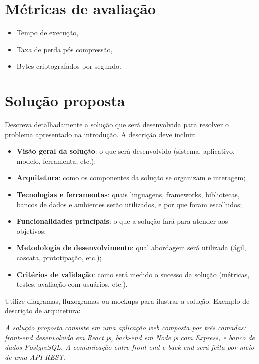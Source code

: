 \documentclass[
    12pt,                %
    openright,           %
    oneside,             %
    a4paper,             %
    english,             %
    brazil               %
]{abntex2}
\begin{document}
\section{Métricas de avaliação}

\begin{itemize}
    \item Tempo de execução,
    \item Taxa de perda pós compressão,
    \item Bytes criptografados por segundo.
\end{itemize}

\section{Solução proposta}
\label{sec:solucao}

Descreva detalhadamente a solução que será desenvolvida para resolver o problema apresentado na introdução. A descrição deve incluir:

\begin{itemize}
    \item \textbf{Visão geral da solução}: o que será desenvolvido (sistema, aplicativo, modelo, ferramenta, etc.);
    \item \textbf{Arquitetura}: como os componentes da solução se organizam e interagem;
    \item \textbf{Tecnologias e ferramentas}: quais linguagens, frameworks, bibliotecas, bancos de dados e ambientes serão utilizados, e por que foram escolhidos;
    \item \textbf{Funcionalidades principais}: o que a solução fará para atender aos objetivos;
    \item \textbf{Metodologia de desenvolvimento}: qual abordagem será utilizada (ágil, cascata, prototipação, etc.);
    \item \textbf{Critérios de validação}: como será medido o sucesso da solução (métricas, testes, avaliação com usuários, etc.).
\end{itemize}

Utilize diagramas, fluxogramas ou mockups para ilustrar a solução. Exemplo de descrição de arquitetura:

\textit{A solução proposta consiste em uma aplicação web composta por três camadas: front-end desenvolvido em React.js, back-end em Node.js com Express, e banco de dados PostgreSQL. A comunicação entre front-end e back-end será feita por meio de uma API REST.}
\end{document}
